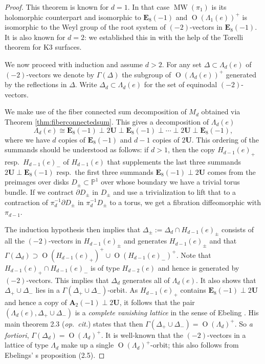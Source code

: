\documentclass[10pt,letterpaper]{amsart}
\numberwithin{equation}{section}
\def\PP{{\mathbb P}}
\def\Ab{\mathbf {A}}
\def\Eb{\mathbf {E}}
\def\Ub{\mathbf{U}}
\def\G{\Gamma}
\newcommand{\p}{\partial}
\newcommand\MW{\operatorname{MW}}
\newcommand\Orth{\operatorname{O}}
\theoremstyle{remark}
\begin{document}
\begin{proof}
This theorem is known for $d=1$. In that case $\MW(\pi_1)$ is its holomorphic counterpart and isomorphic to $\Eb_8(-1)$ and $\Orth(\Lambda_1(e))^+$ is isomorphic to the Weyl group of the root system of $(-2)$-vectors in $\Eb_8(-1)$.   It is also known for $d=2$: we established this  in \cite{FL2} with  the help of the Torelli theorem for K3 surfaces. 

We now proceed with induction and assume $d>2$.  For any set $\Delta\subset \Lambda_d(e)$ of $(-2)$-vectors we denote  by $\G(\Delta)$ the subgroup of $\Orth(\Lambda_d(e))^+$ generated by the reflections in $\Delta$. Write $\Delta_d\subset \Lambda_d(e)$ for the set of equinodal $(-2)$-vectors.

We make use of the  fiber connected sum decomposition of $M_d$ obtained  via Theorem \ref{thm:fiberconnectedsum}. This  gives  a  decomposition of $\Lambda_d(e)$ 
\[
\Lambda_d(e)\cong \Eb_8(-1)\perp 2\Ub\perp \Eb_8(-1)\perp\cdots  \perp 2\Ub\perp \Eb_8(-1),
\]
where we have $d$ copies of $\Eb_8(-1)$ and  $d-1$ copies of $2\Ub$. This ordering of the summands should be understood as follows: if   $d>1$, then the copy  $H_{d-1}(e)_+$  resp.\  $H_{d-1}(e)_-$ of  $H_{d-1}(e)$ that supplements  the last three summands $2\Ub\perp \Eb_8(-1)$ resp.\ the first three summands $ \Eb_8(-1)\perp 2\Ub$ comes from the preimages over disks 
$D_\pm\subset \PP^1$ over whose boundary we have a trivial torus bundle. If we contract $\p D_\pm$ in $D_\pm$ and use a trivialization to lift that to a contraction of  $\pi_d^{-1}\p D_\pm$ in  $\pi_d^{-1}D_\pm$  to a torus, we get a fibration diffeomorphic  with  $\pi_{d-1}$.

The induction hypothesis then implies  that $\Delta_{\pm}:=\Delta_d\cap H_{d-1}(e)_\pm$ consists of  all the $(-2)$-vectors in
$H_{d-1}(e)_\pm$ and generates $H_{d-1}(e)_\pm$  and that  
$\G(\Delta_d)\supset \Orth(H_{d-1}(e)_+)^+\cup \Orth(H_{d-1}(e)_-)^+$. 
Note that $H_{d-1}(e)_+\cap H_{d-1}(e)_-$ is of type $H_{d-2}(e)$ and hence is generated by $(-2)$-vectors. This implies that  
$\Delta_d$ generates all of $\Lambda_d(e)$. It also shows that $\Delta_+\cup \Delta_-$ lies in a $\G(\Delta_+\cup \Delta_-)$-orbit. 
As $H_{d-1}(e)_+$ contains $\Eb_8(-1)\perp 2\Ub$ and hence a copy of $\Ab_2(-1)\perp 2\Ub$, it follows that the pair 
$(\Lambda_d(e), \Delta_+\cup \Delta_-)$ is a \emph{complete vanishing lattice} in the sense of Ebeling \cite{E}. His main theorem 2.3 (\emph{op.\ cit.}) states  that then $\G(\Delta_+\cup \Delta_-)=\Orth(\Lambda_d)^+$. So \emph{a fortiori},   $\G(\Delta_d)=\Orth(\Lambda_d)^+$.
It is well-known that the $(-2)$-vectors in a lattice of type $\Lambda_d$ make up a single $\Orth(\Lambda_d)^+$-orbit; this  also  follows from Ebelings' s proposition  (2.5). 
\end{proof}
\end{document}
